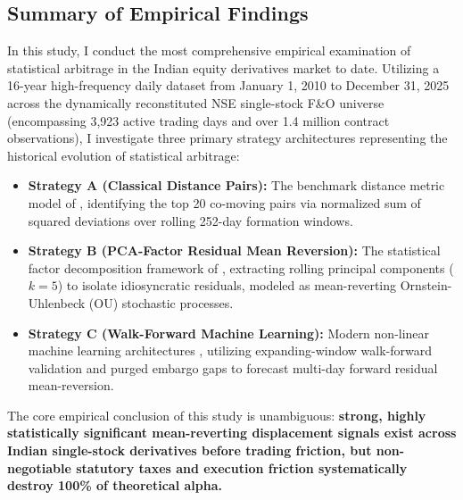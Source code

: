 \documentclass[11pt,a4paper]{article}
\begin{document}
\subsection{Summary of Empirical Findings}
In this study, I conduct the most comprehensive empirical examination of statistical arbitrage in the Indian equity derivatives market to date. Utilizing a 16-year high-frequency daily dataset from January 1, 2010 to December 31, 2025 across the dynamically reconstituted NSE single-stock F\&O universe (encompassing 3,923 active trading days and over 1.4 million contract observations), I investigate three primary strategy architectures representing the historical evolution of statistical arbitrage:
\begin{itemize}
    \item \textbf{Strategy A (Classical Distance Pairs):} The benchmark distance metric model of \citet{gatev2006pairs}, identifying the top 20 co-moving pairs via normalized sum of squared deviations over rolling 252-day formation windows.
    \item \textbf{Strategy B (PCA-Factor Residual Mean Reversion):} The statistical factor decomposition framework of \citet{avellaneda2010statistical}, extracting rolling principal components ($k=5$) to isolate idiosyncratic residuals, modeled as mean-reverting Ornstein-Uhlenbeck (OU) stochastic processes.
    \item \textbf{Strategy C (Walk-Forward Machine Learning):} Modern non-linear machine learning architectures \citep{gu2020empirical,guijarro2021deep}, utilizing expanding-window walk-forward validation and purged embargo gaps to forecast multi-day forward residual mean-reversion.
\end{itemize}

The core empirical conclusion of this study is unambiguous: \textbf{strong, highly statistically significant mean-reverting displacement signals exist across Indian single-stock derivatives before trading friction, but non-negotiable statutory taxes and execution friction systematically destroy 100\% of theoretical alpha.}
\end{document}
